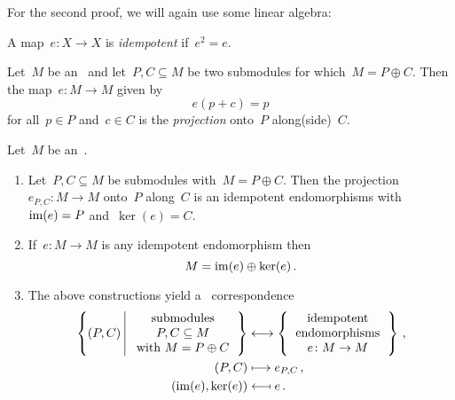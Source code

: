 For the second proof, we will again use some linear algebra:

\begin{definition}
  A map~$e \colon X \to X$ is \emph{idempotent} if~$e^2 = e$.
\end{definition}

\begin{definition}
  Let~$M$ be an~{} and let~$P, C \subseteq M$ be two submodules for which~$M = P \oplus C$.
  Then the map~$e \colon M \to M$ given by
  \[
      e(p + c)
    = p
  \]
  for all~$p \in P$ and~$c \in C$ is the \emph{projection} onto~$P$ along(side)~$C$.
\end{definition}


\begin{recall}
  Let~$M$ be an~{}.
  \begin{enumerate}
    \item
      Let~$P, C \subseteq M$ be submodules with~$M = P \oplus C$.
      Then the projection~$e_{P,C} \colon M \to M$ onto~$P$ along~$C$ is an idempotent endomorphisms with~$\operatorname{im}(e) = P$ and~$\ker(e) = C$.
    \item
      If~$e \colon M \to M$ is any idempotent endomorphism then
      \[
        M = \operatorname{im}(e) \oplus \ker(e) \,.
      \]
    \item
      The above constructions yield a~{\onetoone} correspondence
      \begin{align*}
          \left\{
            (P,C)
          \suchthat*
            \begin{tabular}{c}
              submodules  \\
              $P, C \subseteq M$  \\
              with~$M = P \oplus C$
            \end{tabular}
          \right\}
        &\longleftrightarrow
          \left\{
            \begin{tabular}{c}
              idempotent  \\
              endomorphisms \\
              $e \colon M \to M$
            \end{tabular}
          \right\} \,,
          \\
            (P,C)
          &\longmapsto
            e_{P,C} \,,
          \\
            (\im(e), \ker(e))
          &\longmapsfrom
            e \,.
      \end{align*}
  \end{enumerate}
\end{recall}



